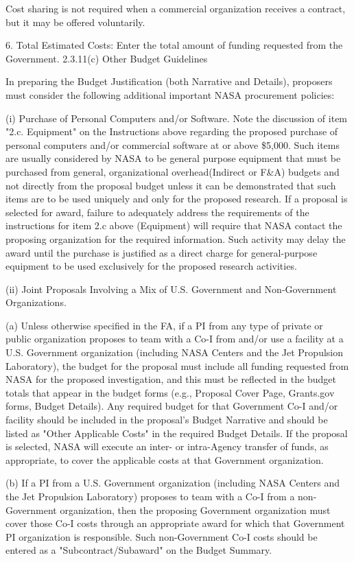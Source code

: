 \documentclass[12pt]{article}
\begin{document}
Cost sharing is not required when a commercial organization receives a
contract, but it may be offered voluntarily.


6. Total Estimated Costs: Enter the total amount of funding requested
   from the Government. 2.3.11(c) Other Budget Guidelines

In preparing the Budget Justification (both Narrative and Details),
proposers must consider the following additional important NASA
procurement policies:

(i) Purchase of Personal Computers and/or Software. Note the
discussion of item "2.c. Equipment" on the Instructions above
regarding the proposed purchase of personal computers and/or
commercial software at or above \$5,000. Such items are usually
considered by NASA to be general purpose equipment that must be
purchased from general, organizational overhead(Indirect or F\&A)
budgets and not directly from the proposal budget unless it can be
demonstrated that such items are to be used uniquely and only for the
proposed research. If a proposal is selected for award, failure to
adequately address the requirements of the instructions for item 2.c
above (Equipment) will require that NASA contact the proposing
organization for the required information. Such activity may delay the
award until the purchase is justified as a direct charge for
general-purpose equipment to be used exclusively for the proposed
research activities.

(ii) Joint Proposals Involving a Mix of U.S. Government and
Non-Government Organizations.

(a) Unless otherwise specified in the FA, if a PI from any type of
private or public organization proposes to team with a Co-I from
and/or use a facility at a U.S. Government organization (including
NASA Centers and the Jet Propulsion Laboratory), the budget for the
proposal must include all funding requested from NASA for the proposed
investigation, and this must be reflected in the budget totals that
appear in the budget forms (e.g., Proposal Cover Page, Grants.gov
forms, Budget Details). Any required budget for that Government Co-I
and/or facility should be included in the proposal's Budget Narrative
and should be listed as "Other Applicable Costs" in the required
Budget Details. If the proposal is selected, NASA will execute an
inter- or intra-Agency transfer of funds, as appropriate, to cover the
applicable costs at that Government organization.

(b) If a PI from a U.S. Government organization (including NASA
Centers and the Jet Propulsion Laboratory) proposes to team with a
Co-I from a non-Government organization, then the proposing Government
organization must cover those Co-I costs through an appropriate award
for which that Government PI organization is responsible. Such
non-Government Co-I costs should be entered as a
"Subcontract/Subaward" on the Budget Summary.
\end{document}
